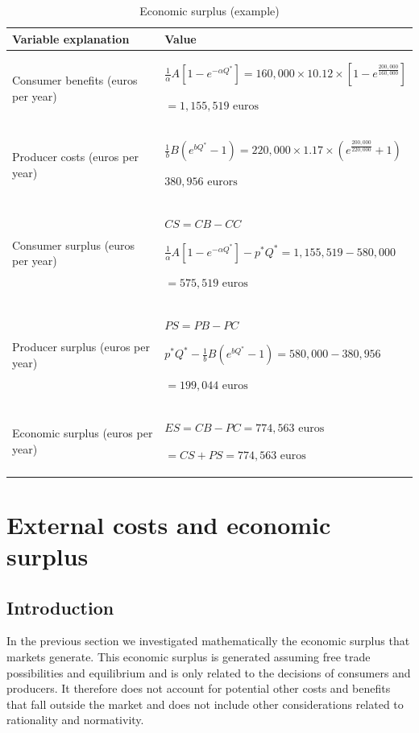 \documentclass[
]{book}
\begin{document}
\begin{table}

\caption{\label{tab:econsurplusexample}Economic surplus (example)}
\centering
\begin{tabular}[t]{ll}
\toprule
Variable explanation & Value\\
\midrule
Consumer benefits (euros per year) & $\frac{1}{\alpha}A[1-e^{-\alpha Q^\ast}] = 160,000 \times 10.12 \times [1 - e^{\frac{200,000}{160,000}}]$

  $= 1,155,519 \text{ euros}$\\
Producer costs (euros per year) & $\frac{1}{b}B(e^{bQ^\ast} - 1) = 220,000 \times 1.17 \times (e^{\frac{200,000}{220,000}} + 1)$

  $380,956 \text{ eurors}$\\
Consumer surplus (euros per year) & $CS = CB - CC$

   $\frac{1}{\alpha}A[1-e^{-\alpha Q^\ast}] - p^\ast Q^\ast = 1,155,519 - 580,000$

   $= 575,519 \text{ euros}$\\
Producer surplus (euros per year) & $PS = PB - PC$

   $p^\ast Q^\ast - \frac{1}{b}B(e^{bQ^\ast} - 1) = 580,000 - 380,956$

   $= 199,044 \text{ euros}$\\
Economic surplus (euros per year) & $ES = CB - PC = 774,563 \text{ euros}$

   $= CS + PS= 774,563 \text{ euros}$\\
\bottomrule
\end{tabular}
\end{table}

\hypertarget{sec:extcosts}{%
\section{External costs and economic surplus}\label{sec:extcosts}}

\hypertarget{introduction-3}{%
\subsection{Introduction}\label{introduction-3}}

In the previous section we investigated mathematically the economic surplus that markets generate. This economic surplus is generated assuming free trade possibilities and equilibrium and is only related to the decisions of consumers and producers. It therefore does not account for potential other costs and benefits that fall outside the market and does not include other considerations related to rationality and normativity.
\end{document}
